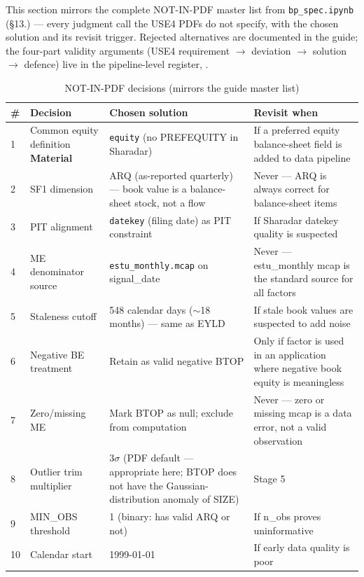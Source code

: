 \documentclass[11pt,a4paper]{article}
\newcommand{\WARN}[1]{\textcolor{warn}{\textbf{#1}}}
\begin{document}
This section mirrors the complete NOT-IN-PDF master list from
\texttt{bp\_spec.ipynb} (\S13.) --- every judgment call the USE4 PDFs do not
specify, with the chosen solution and its revisit trigger. Rejected alternatives
are documented in the guide; the four-part validity arguments (USE4 requirement
$\to$ deviation $\to$ solution $\to$ defence) live in the pipeline-level
register, .

\begin{longtable}{@{}p{0.5cm}p{3.6cm}p{6.0cm}p{3.8cm}@{}}
\caption{NOT-IN-PDF decisions (mirrors the guide master list)}\\
\toprule
\textbf{\#} & \textbf{Decision} & \textbf{Chosen solution} & \textbf{Revisit when} \\
\midrule
\endhead
1 & Common equity definition \WARN{Material} & \texttt{equity} (no PREFEQUITY in Sharadar) & If a preferred equity balance-sheet field is added to data pipeline \\[3pt]
2 & SF1 dimension & ARQ (as-reported quarterly) --- book value is a balance-sheet stock, not a flow & Never --- ARQ is always correct for balance-sheet items \\[3pt]
3 & PIT alignment & \texttt{datekey} (filing date) as PIT constraint & If Sharadar datekey quality is suspected \\[3pt]
4 & ME denominator source & \texttt{estu\_monthly.mcap} on signal\_date & Never --- estu\_monthly mcap is the standard source for all factors \\[3pt]
5 & Staleness cutoff & 548 calendar days ($\sim$18 months) --- same as EYLD & If stale book values are suspected to add noise \\[3pt]
6 & Negative BE treatment & Retain as valid negative BTOP & Only if factor is used in an application where negative book equity is meaningless \\[3pt]
7 & Zero/missing ME & Mark BTOP as null; exclude from computation & Never --- zero or missing mcap is a data error, not a valid observation \\[3pt]
8 & Outlier trim multiplier & 3$\sigma$ (PDF default --- appropriate here; BTOP does not have the Gaussian-distribution anomaly of SIZE) & Stage 5 \\[3pt]
9 & MIN\_OBS threshold & 1 (binary: has valid ARQ or not) & If n\_obs proves uninformative \\[3pt]
10 & Calendar start & 1999-01-01 & If early data quality is poor \\[3pt]
\bottomrule
\end{longtable}
\end{document}
